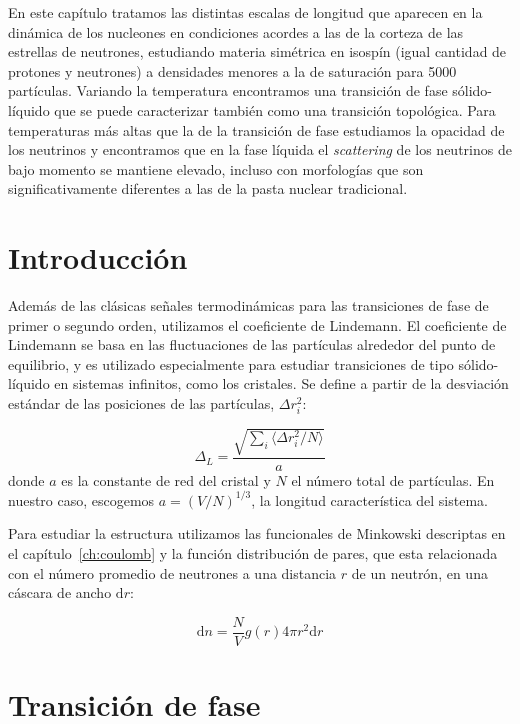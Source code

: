 En este capítulo tratamos las distintas escalas de longitud que aparecen en la dinámica de los nucleones en condiciones acordes a las de la corteza de las estrellas de neutrones, estudiando materia simétrica en isospín (igual cantidad de protones y neutrones) a densidades menores a la de saturación para 5000 partículas.
Variando la temperatura encontramos una transición de fase sólido-líquido que se puede caracterizar también como una transición topológica.
Para temperaturas más altas que la de la transición de fase estudiamos la opacidad de los neutrinos y encontramos que en la fase líquida el \emph{scattering} de los neutrinos de bajo momento se mantiene elevado, incluso con morfologías que son significativamente diferentes a las de la pasta nuclear tradicional.


\section{Introducción}

Además de las clásicas señales termodinámicas para las transiciones de fase de primer o segundo orden, utilizamos el coeficiente de Lindemann.
El coeficiente de Lindemann se basa en las fluctuaciones de las partículas alrededor del punto de equilibrio, y es utilizado especialmente para estudiar transiciones de tipo sólido-líquido en sistemas infinitos, como los cristales.
Se define a partir de la desviación estándar de las posiciones de las partículas, $\Delta r_i^2$:

\begin{equation*}
\Delta_L = \frac{\sqrt{\sum_i\langle\Delta r_i^2/N\rangle}}{a}
\end{equation*}
donde $a$ es la constante de red del cristal y $N$ el número total de partículas.
En nuestro caso, escogemos $a=(V/N)^{1/3}$, la longitud característica del sistema.

Para estudiar la estructura utilizamos las funcionales de Minkowski descriptas en el capítulo~\ref{ch:coulomb} y la función distribución de pares, que esta relacionada con el número promedio de neutrones a una distancia $r$ de un neutrón, en una cáscara de ancho $\text{d}r$:

\begin{equation}
\text{d}n = \frac{N}{V} g(r) 4\pi r^2 \text{d}r
\end{equation}


\section{Transición de fase}\label{phase_transition}
